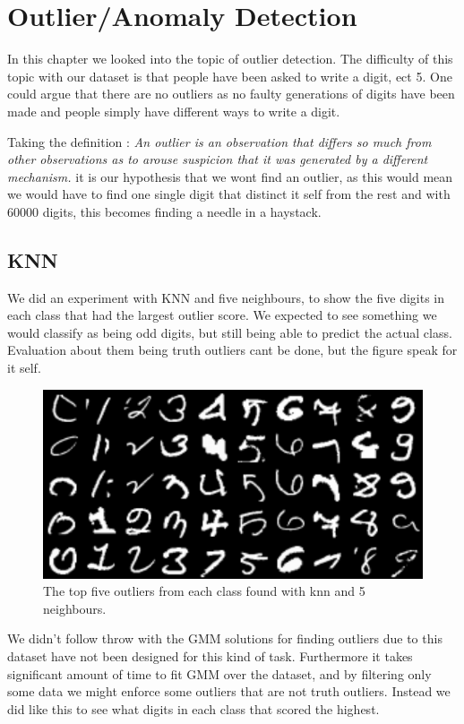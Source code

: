 \chapter{Outlier/Anomaly Detection}

In this chapter we looked into the topic of outlier detection. The difficulty of this topic with our dataset is that people have been asked to write a digit, ect 5. One could argue that there are no outliers as no faulty generations of digits have been made and people simply have different ways to write a digit. 

Taking the definition : \textit{An outlier is an observation that differs so much from other observations as to arouse suspicion that it was generated by a different mechanism.} it is our hypothesis that we wont find an outlier, as this would mean we would have to find one single digit that distinct it self from the rest and with 60000 digits, this becomes finding a needle in a haystack.

\section{KNN}
We did an experiment with KNN and five neighbours, to show the five digits in each class that had the largest outlier score. We expected to see something we would classify as being odd digits, but still being able to predict the actual class. Evaluation about them being truth outliers cant be done, but the figure speak for it self.   

\begin{figure}[H]
\centering
\includegraphics[width=0.6\linewidth]{code/knn_5_outlier}
\caption{The top five outliers from each class found with knn and 5 neighbours.}
\label{fig:outlier_knn}
\end{figure}

We didn't follow throw with the GMM solutions for finding outliers due to this dataset have not been designed for this kind of task. Furthermore it takes significant amount of time to fit GMM over the dataset, and by filtering only some data we might enforce some outliers that are not truth outliers. Instead we did like this to see what digits in each class that scored the highest.